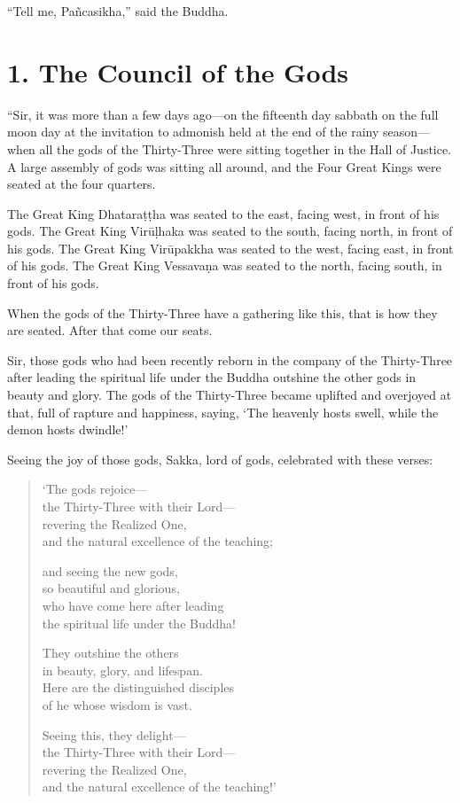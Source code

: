 \documentclass[12pt,openany]{book}%
\begin{document}
“Tell me, \textsanskrit{Pañcasikha},” said the Buddha. 

\section*{1. The Council of the Gods }

“Sir, it was more than a few days ago—on the fifteenth day sabbath on the full moon day at the invitation to admonish held at the end of the rainy season—when all the gods of the Thirty-Three were sitting together in the Hall of Justice. A large assembly of gods was sitting all around, and the Four Great Kings were seated at the four quarters. 

The Great King \textsanskrit{Dhataraṭṭha} was seated to the east, facing west, in front of his gods. The Great King \textsanskrit{Virūḷhaka} was seated to the south, facing north, in front of his gods. The Great King \textsanskrit{Virūpakkha} was seated to the west, facing east, in front of his gods. The Great King \textsanskrit{Vessavaṇa} was seated to the north, facing south, in front of his gods. 

When the gods of the Thirty-Three have a gathering like this, that is how they are seated. After that come our seats. 

Sir, those gods who had been recently reborn in the company of the Thirty-Three after leading the spiritual life under the Buddha outshine the other gods in beauty and glory. The gods of the Thirty-Three became uplifted and overjoyed at that, full of rapture and happiness, saying, ‘The heavenly hosts swell, while the demon hosts dwindle!’ 

Seeing the joy of those gods, Sakka, lord of gods, celebrated with these verses: 

\begin{verse}%
‘The gods rejoice—\\
the Thirty-Three with their Lord—\\
revering the Realized One, \\
and the natural excellence of the teaching; 

and seeing the new gods, \\
so beautiful and glorious, \\
who have come here after leading \\
the spiritual life under the Buddha! 

They outshine the others \\
in beauty, glory, and lifespan. \\
Here are the distinguished disciples \\
of he whose wisdom is vast. 

Seeing this, they delight—\\
the Thirty-Three with their Lord—\\
revering the Realized One, \\
and the natural excellence of the teaching!’ 

%
\end{verse}
\end{document}
